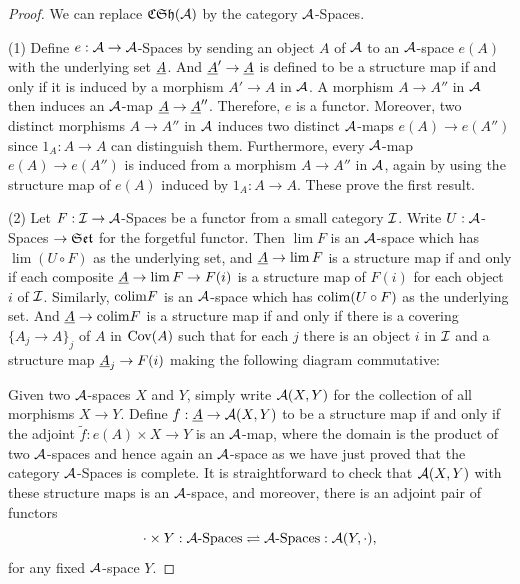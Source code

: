\begin{proof}
  We can replace $\mathfrak{CSh}(\mathcal{A})$ by the category $\mathcal{A}$-Spaces.

  (1) Define $e:\mathcal{A} \to \mathcal{A}$-Spaces by sending an object $A$ of $\mathcal{A}$ to an $\mathcal{A}$-space $e(A)$ with the underlying set $\underline{A}$. And $\underline{A}' \to \underline{A}$ is defined to be a structure map if and only if it is induced by a morphism $A' \to A$ in $\mathcal{A}$.
  A morphism $A \to A''$ in $\mathcal{A}$ then induces an $\mathcal{A}$-map $\underline{A} \to \underline{A}''$.
  Therefore,
  $e$ is a functor.
  Moreover,
  two distinct morphisms $A \to A''$ in $\mathcal{A}$ induces two distinct $\mathcal{A}$-maps $e(A) \to e(A'')$ since $1_A:A \to A$ can distinguish them.
  Furthermore,
  every $\mathcal{A}$-map $e(A) \to e(A'')$ is induced from a morphism $A \to A''$ in $\mathcal{A}$,
  again by using the structure map of $e(A)$ induced by $1_A:A \to A$.
  These prove the first result.

  (2) Let $F:\mathcal{I} \to \mathcal{A}$-Spaces be a functor from a small category $\mathcal{I}$.
  Write $U:\mathcal{A}$-Spaces $\to \mathfrak{Set}$ for the forgetful functor.
  Then $\lim F$ is an $\mathcal{A}$-space which has $\lim (U \circ F)$ as the underlying set,
  and $\underline{A} \to \lim F$ is a structure map if and only if each composite $\underline{A} \to \lim F \to F(i)$ is a structure map of $F(i)$ for each object $i$ of $\mathcal{I}$.
  Similarly, $\mathrm{colim} F$ is an $\mathcal{A}$-space which has $\mathrm{colim} (U \circ F)$ as the underlying set.
  And $\underline{A} \to \mathrm{colim} F$ is a structure map if and only if there is a covering $\{A_j \to A\}_j$ of $A$ in $\mathrm{Cov}(A)$ such that for each $j$ there is an object $i$ in $\mathcal{I}$ and a structure map $\underline{A}_j \to F(i)$ making the following diagram commutative:
  \begin{center}
  \end{center}
  Given two $\mathcal{A}$-spaces $X$ and $Y$,
  simply write $\mathcal{A}(X,Y)$ for the collection of all morphisms $X \to Y$.
  Define $f:\underline{A} \to \mathcal{A}(X,Y)$ to be a structure map if and only if the adjoint $\tilde{f}:e(A) \times X \to Y$ is an $\mathcal{A}$-map,
  where the domain is the product of two $\mathcal{A}$-spaces and hence again an $\mathcal{A}$-space as we have just proved that the category $\mathcal{A}$-Spaces is complete.
  It is straightforward to check that $\mathcal{A}(X,Y)$ with these structure maps is an $\mathcal{A}$-space,
  and moreover,
  there is an adjoint pair of functors
  $$
    \cdot \times Y:\mathcal{A}\text{-Spaces} \rightleftharpoons \mathcal{A}\text{-Spaces}:\mathcal{A}(Y,\cdot),
  $$
  for any fixed $\mathcal{A}$-space $Y$.


\end{proof}
